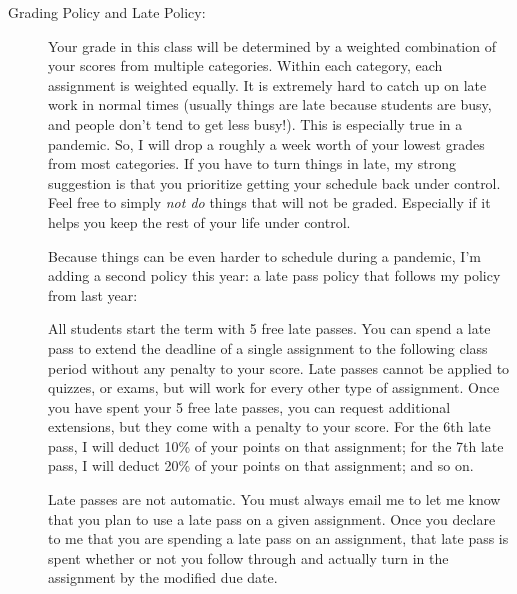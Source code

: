 \documentclass[12pt]{article}
\begin{document}
{\begin{description}
  \item[Grading Policy and Late Policy:]
        Your grade in this class will be determined by a weighted
        combination of your scores from multiple categories. Within
        each category, each assignment is weighted equally. It is
        extremely hard to catch up on late work in normal times
        (usually things are late because students are busy, and people
        don't tend to get less busy!). This is especially true in a
        pandemic. So, I will drop a roughly a week worth of your
        lowest grades from most categories. If you have to turn things
        in late, my strong suggestion is that you prioritize getting
        your schedule back under control. Feel free to simply
        \textit{not do} things that will not be graded. Especially if
        it helps you keep the rest of your life under control.

        Because things can be even harder to schedule during a
        pandemic, I'm adding a second policy this year: a late pass
        policy that follows my policy from last year:

        All students start the term with 5 free late
        passes. You can spend a late pass to extend the deadline of a
        single assignment to the following class period without any
        penalty to your score. Late passes cannot be applied to
        quizzes, or exams, but will work for
        every other type of assignment. Once you have spent your 5
        free late passes, you can request additional extensions, but
        they come with a penalty to your score. For the 6th late pass,
        I will deduct 10\% of your points on that assignment; for the
        7th late pass, I will deduct 20\% of your points on that
        assignment; and so on.
        
        Late passes are not automatic. You must always email me to let me know
        that you plan to use a late pass on a given assignment. Once
        you declare to me that you are spending a  late pass on an
        assignment, that late pass is spent whether or not you follow
        through and actually turn in the assignment by the modified
        due date.


\end{description}}
\end{document}
